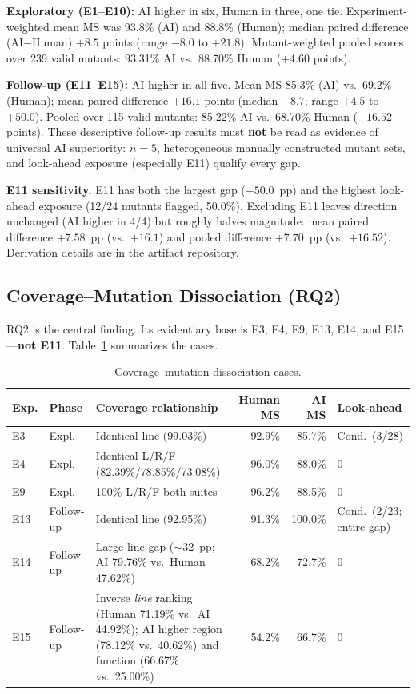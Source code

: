 \documentclass[10pt,conference]{IEEEtran}
\begin{document}
\textbf{Exploratory (E1--E10):} AI higher in six, Human in three, one tie. Experiment-weighted mean MS was 93.8\% (AI) and 88.8\% (Human); median paired difference (AI$-$Human) $+8.5$ points (range $-8.0$ to $+21.8$). Mutant-weighted pooled scores over 239 valid mutants: 93.31\% AI vs.\ 88.70\% Human ($+4.60$ points).

\textbf{Follow-up (E11--E15):} AI higher in all five. Mean MS 85.3\% (AI) vs.\ 69.2\% (Human); mean paired difference $\mathbf{+16.1}$ points (median $+8.7$; range $+4.5$ to $+50.0$). Pooled over 115 valid mutants: 85.22\% AI vs.\ 68.70\% Human ($+16.52$ points). These descriptive follow-up results must \textbf{not} be read as evidence of universal AI superiority: $n{=}5$, heterogeneous manually constructed mutant sets, and look-ahead exposure (especially E11) qualify every gap.

\textbf{E11 sensitivity.} E11 has both the largest gap ($+50.0$~pp) and the highest look-ahead exposure (12/24 mutants flagged, 50.0\%). Excluding E11 leaves direction unchanged (AI higher in 4/4) but roughly halves magnitude: mean paired difference $\mathbf{+7.58}$~pp (vs.\ $+16.1$) and pooled difference $\mathbf{+7.70}$~pp (vs.\ $+16.52$). Derivation details are in the artifact repository.

\subsection{Coverage--Mutation Dissociation (RQ2)}
RQ2 is the central finding. Its evidentiary base is E3, E4, E9, E13, E14, and E15---\textbf{not E11}. Table~\ref{tab:rq2} summarizes the cases.

\begin{table}[t]
\centering
\caption{Coverage--mutation dissociation cases.}
\label{tab:rq2}
\small
\begin{tabular}{llp{4.6cm}rrl}
\toprule
Exp. & Phase & Coverage relationship & Human MS & AI MS & Look-ahead \\
\midrule
E3 & Expl. & Identical line (99.03\%) & 92.9\% & 85.7\% & Cond.\ (3/28) \\
E4 & Expl. & Identical L/R/F (82.39\%/78.85\%/73.08\%) & 96.0\% & 88.0\% & 0 \\
E9 & Expl. & 100\% L/R/F both suites & 96.2\% & 88.5\% & 0 \\
E13 & Follow-up & Identical line (92.95\%) & 91.3\% & 100.0\% & Cond.\ (2/23; entire gap) \\
E14 & Follow-up & Large line gap ($\sim$32~pp; AI 79.76\% vs.\ Human 47.62\%) & 68.2\% & 72.7\% & 0 \\
E15 & Follow-up & Inverse \emph{line} ranking (Human 71.19\% vs.\ AI 44.92\%); AI higher region (78.12\% vs.\ 40.62\%) and function (66.67\% vs.\ 25.00\%) & 54.2\% & 66.7\% & 0 \\
\bottomrule
\end{tabular}
\end{table}
\end{document}
